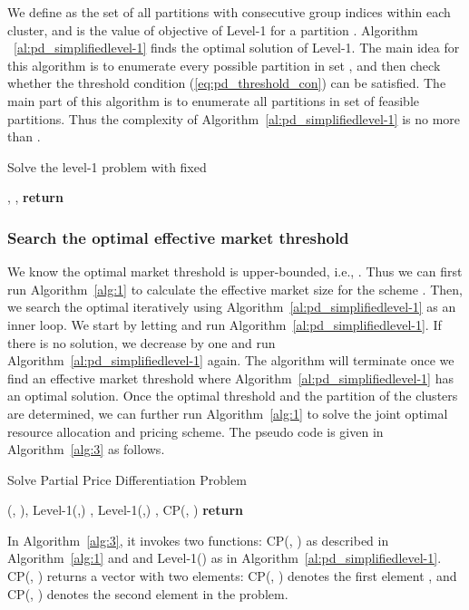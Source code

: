\documentclass[twocolumn,10pt,twosided]{IEEEtran}
\begin{document}
We define  as the set of all partitions with consecutive group indices within each cluster, and   is the value of objective of Level-1 for a partition . Algorithm ~\ref{al:pd_simplifiedlevel-1} finds the optimal solution of  Level-1. The main idea for this algorithm is to enumerate every possible partition in set , and then check whether the threshold condition (\ref{eq:pd_threshold_con}) can be satisfied. The main part of this algorithm is to enumerate all partitions in set  of  feasible partitions. Thus the
complexity of Algorithm~\ref{al:pd_simplifiedlevel-1} is no more than .
\begin{algorithm}[htb]
\caption{Solve the level-1 problem with fixed }
\label{al:pd_simplifiedlevel-1}
\begin{algorithmic}[1]
    \State 
    \State ,  \For{}
			\If{} \If{}
					\State , 
				\EndIf
			\EndIf
    \EndFor
    \State \textbf{return} 
    \EndFunction
\end{algorithmic}
\end{algorithm}




\subsubsection{Search the optimal effective market threshold  }
We know the optimal market threshold  is upper-bounded, i.e., . Thus we can first run Algorithm~{\ref{alg:1}} to calculate the effective market size for the  scheme . Then, we search the optimal  iteratively  using Algorithm~\ref{al:pd_simplifiedlevel-1} as an inner loop. We start by letting   and run Algorithm~\ref{al:pd_simplifiedlevel-1}. If there is no solution, we decrease  by one and run Algorithm~\ref{al:pd_simplifiedlevel-1} again. The algorithm will terminate once we find an effective market threshold where Algorithm~\ref{al:pd_simplifiedlevel-1} has an optimal solution.
Once the optimal threshold and the partition of the clusters are determined, we can further run  Algorithm~{\ref{alg:1}} to solve the joint optimal resource allocation and pricing scheme. The pseudo code is given in Algorithm~\ref{alg:3} as follows.

\begin{algorithm}[htb]                      \caption{Solve Partial Price Differentiation Problem}     \begin{algorithmic}[1]
		\State  {}(, ),  Level-1(,)\While{} \State ,  Level-1(,)
\EndWhile  \For{} \State , 
		\EndFor
		\State  CP(, )
	\For {} \State 
	\EndFor
   \State \textbf{return} 
\end{algorithmic}
\label{alg:3}                      \end{algorithm}
In Algorithm~\ref{alg:3}, it invokes two functions: CP(, ) as described in Algorithm~\ref{alg:1} and  and Level-1() as in Algorithm~\ref{al:pd_simplifiedlevel-1}. CP(, ) returns a vector with two elements: CP(, ) denotes the first element , and {CP}(, ) denotes the second element  in the  problem.
\end{document}
